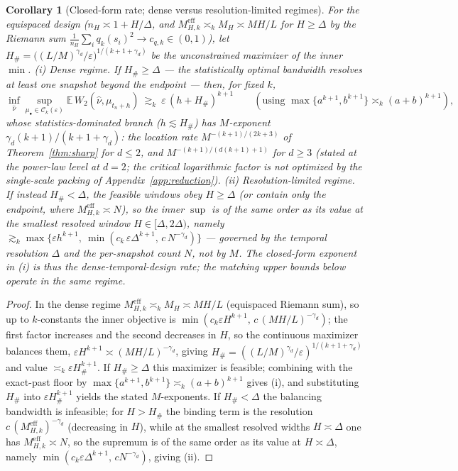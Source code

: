 \documentclass[11pt]{article}
\newtheorem{corollary}{Corollary}
\theoremstyle{definition}
\theoremstyle{remark}
\newcommand{\E}{\mathbb{E}}
\newcommand{\Ck}{\mathcal{C}_k(\varepsilon)}
\begin{document}
\begin{corollary}[Closed-form rate; dense versus resolution-limited regimes]\label{cor:denserate}
For the equispaced design ($n_H\asymp1+H/\Delta$, and $M^{\mathrm{eff}}_{H,k}\asymp_k M_H\asymp MH/L$
for $H\ge\Delta$ by the Riemann sum $\tfrac1{n_H}\sum_i q_k(s_i)^2\to c_{q,k}\in(0,1)$), let
$H_\#=\big((L/M)^{\gamma_d}/\varepsilon\big)^{1/(k+1+\gamma_d)}$ be the unconstrained maximizer of the
inner $\min$. \emph{(i) Dense regime.} If $H_\#\ge\Delta$ --- the statistically optimal bandwidth
resolves at least one snapshot beyond the endpoint --- then, for fixed $k$,
\[
   \inf_{\hat\nu}\sup_{\mu_\bullet\in\Ck}\E\,W_2(\hat\nu,\mu_{t_n+h})\ \gtrsim_k\
   \varepsilon\,(h+H_\#)^{k+1}
   \qquad(\text{using }\max\{a^{k+1},b^{k+1}\}\asymp_k(a+b)^{k+1}),
\]
whose statistics-dominated branch ($h\lesssim H_\#$) has $M$-exponent $\gamma_d(k+1)/(k+1+\gamma_d)$:
the location rate $M^{-(k+1)/(2k+3)}$ of Theorem~\ref{thm:sharp} for $d\le2$, and
$M^{-(k+1)/(d(k+1)+1)}$ for $d\ge3$ (stated at the power-law level at $d=2$; the critical logarithmic
factor is not optimized by the single-scale packing of Appendix~\ref{app:reduction}).
\emph{(ii) Resolution-limited regime.} If instead $H_\#<\Delta$, the feasible windows obey $H\ge\Delta$
(or contain only the endpoint, where $M^{\mathrm{eff}}_{H,k}\asymp N$), so the inner $\sup$ is of the
same order as its value at the smallest resolved window $H\in[\Delta,2\Delta)$, namely
$\gtrsim_k\max\{\varepsilon h^{k+1},\ \min(c_k\,\varepsilon\Delta^{k+1},\,c\,N^{-\gamma_d})\}$ ---
governed by the temporal resolution $\Delta$ and the per-snapshot count $N$, not by $M$. The
closed-form exponent in (i) is thus the dense-temporal-design rate; the matching upper bounds below
operate in the same regime.
\end{corollary}
\begin{proof}
In the dense regime $M^{\mathrm{eff}}_{H,k}\asymp_k M_H\asymp MH/L$ (equispaced Riemann sum), so up to
$k$-constants the inner objective is $\min(c_k\varepsilon H^{k+1},\,c\,(MH/L)^{-\gamma_d})$; the first
factor increases and the second decreases in $H$, so the continuous maximizer balances them,
$\varepsilon H^{k+1}\asymp(MH/L)^{-\gamma_d}$, giving
$H_\#=((L/M)^{\gamma_d}/\varepsilon)^{1/(k+1+\gamma_d)}$ and value $\asymp_k\varepsilon H_\#^{k+1}$.
If $H_\#\ge\Delta$ this maximizer is feasible; combining with the exact-past floor by
$\max\{a^{k+1},b^{k+1}\}\asymp_k(a+b)^{k+1}$ gives (i), and substituting $H_\#$ into
$\varepsilon H_\#^{k+1}$ yields the stated $M$-exponents. If $H_\#<\Delta$ the balancing bandwidth is
infeasible; for $H>H_\#$ the binding term is the resolution $c\,(M^{\mathrm{eff}}_{H,k})^{-\gamma_d}$
(decreasing in $H$), while at the smallest resolved widths $H\asymp\Delta$ one has
$M^{\mathrm{eff}}_{H,k}\asymp N$, so the supremum is of the same order as its value at $H\asymp\Delta$,
namely $\min(c_k\varepsilon\Delta^{k+1},\,cN^{-\gamma_d})$, giving (ii).
\end{proof}
\end{document}
